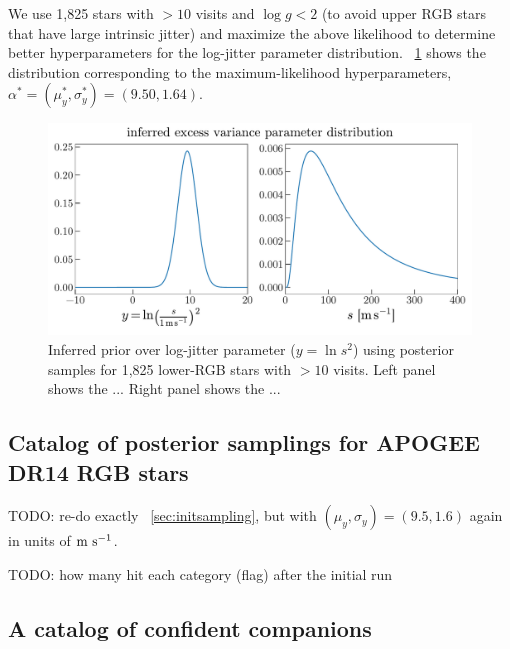 \documentclass[modern, letterpaper]{aastex62}
\begin{document}
\begin{enumerate}
We use 1,825 stars with $>10$ visits and $\log g < 2$ (to avoid upper RGB stars
that have large intrinsic jitter) and maximize the above likelihood to determine
better hyperparameters for the log-jitter parameter distribution.
\figurename~\ref{fig:infer-jitter} shows the distribution corresponding to the
maximum-likelihood hyperparameters, $\alpha^* = (\mu_y^*, \sigma_y^*) = (9.50,
1.64)$.

\begin{figure}[h]
\begin{center}
\includegraphics[width=\textwidth]{infer-jitter}
\end{center}
\caption{%
Inferred prior over log-jitter parameter ($y = \ln s^2$) using posterior samples
for 1,825 lower-RGB stars with $>10$ visits.
Left panel shows the ... Right panel shows the ...
\label{fig:infer-jitter}
}
\end{figure}

\subsection{Catalog of posterior samplings for APOGEE DR14 RGB stars}
\label{sec:fullcatalog}

TODO: re-do exactly \sectionname~\ref{sec:initsampling}, but with $(\mu_{y}, \sigma_{y}) = (9.5, 1.6)$ again in units of ${\rm m}~{\rm s}^{-1}$.

TODO: how many hit each category (flag) after the initial run

\subsection{A catalog of confident companions} \label{sec:conf-companions}


\end{enumerate}
\end{document}
